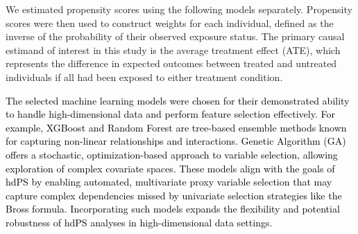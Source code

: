 \documentclass[10pt,letterpaper]{article}
\begin{document}
We estimated propensity scores using the following models separately.
Propensity scores were then used to construct weights for each
individual, defined as the inverse of the probability of their observed
exposure status. The primary causal estimand of interest in this study
is the average treatment effect (ATE), which represents the difference
in expected outcomes between treated and untreated individuals if all
had been exposed to either treatment condition.

\textcolor{black}{The selected machine learning models were chosen for their demonstrated ability to handle high-dimensional data and perform feature selection effectively. For example, XGBoost and Random Forest are tree-based ensemble methods known for capturing non-linear relationships and interactions. Genetic Algorithm (GA) offers a stochastic, optimization-based approach to variable selection, allowing exploration of complex covariate spaces. These models align with the goals of hdPS by enabling automated, multivariate proxy variable selection that may capture complex dependencies missed by univariate selection strategies like the Bross formula. Incorporating such models expands the flexibility and potential robustness of hdPS analyses in high-dimensional data settings.}
\end{document}
